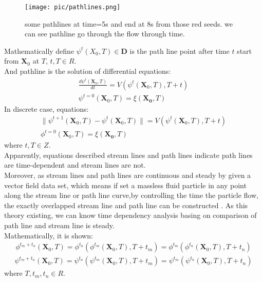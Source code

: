 \documentclass[
     11pt,         %
     a4paper,      %
     oneside,
     ]{article}
\newcommand{\vect}[1]{\boldsymbol{#1}}
\begin{document}
	\begin{figure}[H]
			\centering
			\texttt{[image: pic/pathlines.png]}
			\caption{{\tiny some pathlines at time=5s and end at 8s from those red seeds. we can see pathline go through the flow through time.}}
			\label{fig:pathlineatfrom5s}
		\end{figure}
	Mathematically define $\psi^{t}(X_{0},T)\in\vect{D}$ is the path line point after time $t$ start from $\vect{X}_{0}$ at $T$, $t,T\in R$.\\
	And pathline is the solution of differential equations:\\
    \begin{eqnarray}
    \frac{d\psi^{t}(\vect{X}_{0},T)}{dt}=V(\psi^{t}(\vect{X}_{0},T),T+t)\\
    \psi^{t=0}(\vect{X}_{0},T)=\xi(\vect{X_{0}},T)
    \end{eqnarray}
    In discrete case, equations:\\
    \begin{eqnarray}
    \lVert\psi^{t+1}(\vect{X}_{0},T)-\psi^{t}(\vect{X}_{0},T)\rVert=V(\psi^{t}(\vect{X}_{0},T),T+t)\\
    \phi^{t=0}(\vect{X}_{0},T)=\xi(\vect{X_{0}},T)
    \end{eqnarray}
    where $t,T\in Z$.\\ 
    Apparently, equations described stream lines and path lines indicate path lines are time-dependent and stream lines are not.\\
	Moreover, as stream lines and path lines are continuous and steady by given a vector field data set, which means if set a massless fluid particle in any point along the stream line or path line curve,by controlling the time the particle flow, the exactly overlapped stream line and path line can be constructed . As this theory existing, we can know time dependency analysis basing on comparison of path line and stream line is steady.\\
	Mathematically, it is shown:\\
	\begin{eqnarray}
	\phi^{t_{m}+t_{n}}(\vect{X}_{0},T)=\phi^{t_{n}}(\phi^{t_{m}}(\vect{X}_{0},T),T+t_{m})=\phi^{t_{m}}(\phi^{t_{n}}(\vect{X}_{0},T),T+t_{n})
	\label{Equation:StreamlinePoint}
	\end{eqnarray}
	\begin{eqnarray}
	\psi^{t_{m}+t_{n}}(\vect{X}_{0},T)=\psi^{t_{n}}(\psi^{t_{m}}(\vect{X}_{0},T),T+t_{m})=\psi^{t_{m}}(\psi^{t_{n}}(\vect{X}_{0},T),T+t_{n})
	\end{eqnarray}
	where $T,t_{m},t_{n}\in R$.
\end{document}
